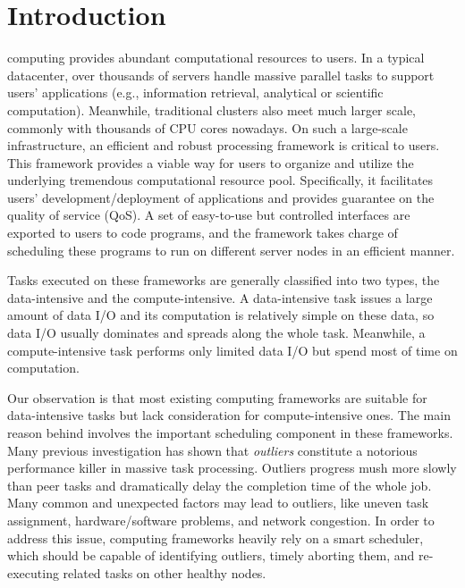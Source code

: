 \section{Introduction}

 computing provides abundant computational resources to users. In a typical datacenter, over thousands of servers handle massive parallel tasks to support users' applications (e.g., information retrieval, analytical or scientific computation). Meanwhile, traditional clusters also meet much larger scale, commonly with thousands of CPU cores nowadays. On such a large-scale infrastructure, an efficient and robust processing framework is critical to users. This framework provides a viable way for users to organize and utilize the underlying tremendous computational resource pool. Specifically, it facilitates users' development/deployment of applications and provides guarantee on the quality of service (QoS). A set of easy-to-use but controlled interfaces are exported to users to code programs, and the framework takes charge of scheduling these programs to run on different server nodes in an efficient manner.

Tasks executed on these frameworks are generally classified into two types, the data-intensive and the compute-intensive. A data-intensive task issues a large amount of data I/O and its computation is relatively simple on these data, so data I/O usually dominates and spreads along the whole task. Meanwhile, a compute-intensive task performs only limited data I/O but spend most of time on computation.

Our observation is that most existing computing frameworks are suitable for data-intensive tasks but lack consideration for compute-intensive ones. The main reason behind involves the important scheduling component in these frameworks. Many previous investigation has shown that \textit{outliers} constitute a notorious performance killer in massive task processing. Outliers progress mush more slowly than peer tasks and dramatically delay the completion time of the whole job. Many common and unexpected factors may lead to outliers, like uneven task assignment, hardware/software problems, and network congestion. In order to address this issue, computing frameworks heavily rely on a smart scheduler, which should be capable of identifying outliers, timely aborting them, and re-executing related tasks on other healthy nodes. 

